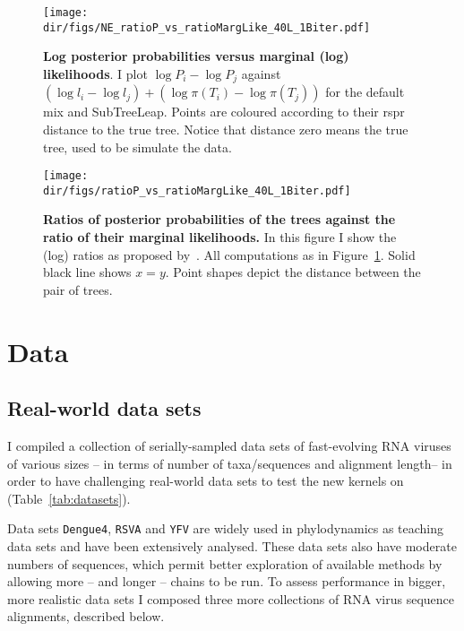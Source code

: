 \begin{figure}[!ht]
\centering
\texttt{[image: \\dir/figs/NE\_ratioP\_vs\_ratioMargLike\_40L\_1Biter.pdf]}
\caption[Log posterior probabilities versus marginal (log) likelihoods.]{\textbf{Log posterior probabilities versus marginal (log) likelihoods}.
I plot $\log P_i - \log P_j$ against $(\log l_i - \log l_j) + (\log \pi(T_i) - \log\pi(T_j))$ for the default mix and SubTreeLeap.
Points are coloured according to their rspr distance to the true tree.
Notice that distance zero means the true tree, used to be simulate the data.
}
\label{fig:logP}
\end{figure}
\begin{figure}[!ht]
\centering
\texttt{[image: \\dir/figs/ratioP\_vs\_ratioMargLike\_40L\_1Biter.pdf]}
\caption[Ratios of posterior probabilities of the trees against the ratio of their marginal likelihoods.]{\textbf{Ratios of posterior probabilities of the trees against the ratio of their marginal likelihoods.}
In this figure I show the (log) ratios as proposed by~\cite{Hoehna2008}.
All computations as in Figure~\ref{fig:logP}.
Solid black line shows $x = y$.
Point shapes depict the distance between the pair of trees.
}
\label{fig:ratios}
\end{figure}  

\section{Data}

\subsection{Real-world data sets}
\label{sec:realworld}

I compiled a collection of serially-sampled data sets of fast-evolving RNA viruses of various sizes -- in terms of number of taxa/sequences and  alignment length-- in order to have challenging real-world data sets to test the new kernels on (Table~\ref{tab:datasets}).

Data sets \verb|Dengue4|, \verb|RSVA| and \verb|YFV| are widely used in phylodynamics as teaching data sets and have been extensively analysed.
These data sets also have moderate numbers of sequences, which permit better exploration of available methods by allowing more -- and longer -- chains to be run.
To assess performance in bigger, more realistic data sets I composed three more collections of RNA virus sequence alignments, described below.

